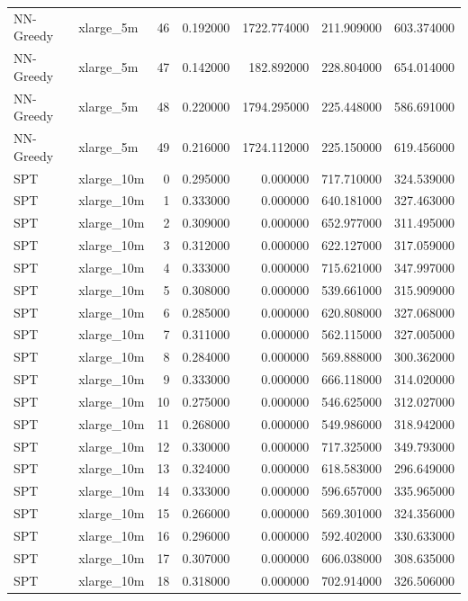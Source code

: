 \begin{tabular}{llrrrrr}
NN-Greedy & xlarge_5m & 46 & 0.192000 & 1722.774000 & 211.909000 & 603.374000 \\
NN-Greedy & xlarge_5m & 47 & 0.142000 & 182.892000 & 228.804000 & 654.014000 \\
NN-Greedy & xlarge_5m & 48 & 0.220000 & 1794.295000 & 225.448000 & 586.691000 \\
NN-Greedy & xlarge_5m & 49 & 0.216000 & 1724.112000 & 225.150000 & 619.456000 \\
SPT & xlarge_10m & 0 & 0.295000 & 0.000000 & 717.710000 & 324.539000 \\
SPT & xlarge_10m & 1 & 0.333000 & 0.000000 & 640.181000 & 327.463000 \\
SPT & xlarge_10m & 2 & 0.309000 & 0.000000 & 652.977000 & 311.495000 \\
SPT & xlarge_10m & 3 & 0.312000 & 0.000000 & 622.127000 & 317.059000 \\
SPT & xlarge_10m & 4 & 0.333000 & 0.000000 & 715.621000 & 347.997000 \\
SPT & xlarge_10m & 5 & 0.308000 & 0.000000 & 539.661000 & 315.909000 \\
SPT & xlarge_10m & 6 & 0.285000 & 0.000000 & 620.808000 & 327.068000 \\
SPT & xlarge_10m & 7 & 0.311000 & 0.000000 & 562.115000 & 327.005000 \\
SPT & xlarge_10m & 8 & 0.284000 & 0.000000 & 569.888000 & 300.362000 \\
SPT & xlarge_10m & 9 & 0.333000 & 0.000000 & 666.118000 & 314.020000 \\
SPT & xlarge_10m & 10 & 0.275000 & 0.000000 & 546.625000 & 312.027000 \\
SPT & xlarge_10m & 11 & 0.268000 & 0.000000 & 549.986000 & 318.942000 \\
SPT & xlarge_10m & 12 & 0.330000 & 0.000000 & 717.325000 & 349.793000 \\
SPT & xlarge_10m & 13 & 0.324000 & 0.000000 & 618.583000 & 296.649000 \\
SPT & xlarge_10m & 14 & 0.333000 & 0.000000 & 596.657000 & 335.965000 \\
SPT & xlarge_10m & 15 & 0.266000 & 0.000000 & 569.301000 & 324.356000 \\
SPT & xlarge_10m & 16 & 0.296000 & 0.000000 & 592.402000 & 330.633000 \\
SPT & xlarge_10m & 17 & 0.307000 & 0.000000 & 606.038000 & 308.635000 \\
SPT & xlarge_10m & 18 & 0.318000 & 0.000000 & 702.914000 & 326.506000 \\

\end{tabular}
